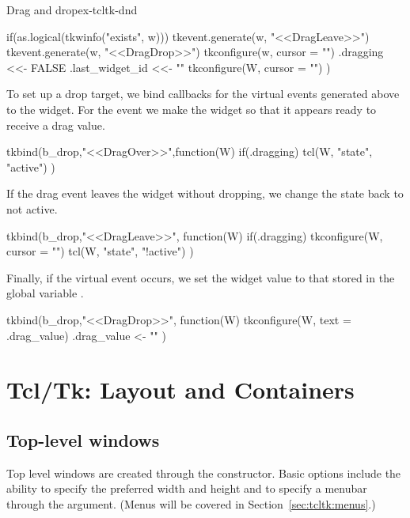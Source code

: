 \begin{example}{Drag and drop}{ex-tcltk-dnd}
\begin{Schunk}
\begin{Sinput}
{   if(as.logical(tkwinfo("exists", w))) {
     tkevent.generate(w, "<<DragLeave>>")
     tkevent.generate(w, "<<DragDrop>>")
     tkconfigure(w, cursor = "")
   }
   .dragging <<- FALSE
   .last_widget_id <<- "" 
   tkconfigure(W, cursor = "")
 })
\end{Sinput}
\end{Schunk}
%
%
To set up a drop target, we bind callbacks for the virtual events
generated above to the widget. For the  event
we make the widget  so that it appears ready to receive a
drag value.
\begin{Schunk}
\begin{Sinput}
 tkbind(b_drop,"<<DragOver>>",function(W) {
   if(.dragging) 
     tcl(W, "state", "active")
 })
\end{Sinput}
\end{Schunk}
%
If the drag event leaves the widget without dropping, we change the
state back to not active.
\begin{Schunk}
\begin{Sinput}
 tkbind(b_drop,"<<DragLeave>>", function(W) {
   if(.dragging)  {
     tkconfigure(W, cursor = "")
     tcl(W, "state", "!active")  
    }
 })
\end{Sinput}
\end{Schunk}
%
Finally, if the  virtual event occurs, we set
the widget value to that stored in the global variable
.
\begin{Schunk}
\begin{Sinput}
 tkbind(b_drop,"<<DragDrop>>", function(W) {
   tkconfigure(W, text = .drag_value)
   .drag_value <- ""
 })
\end{Sinput}
\end{Schunk}
\end{example}



\chapter{Tcl/Tk: Layout and Containers}
\label{sec:tcltk:basic-containers}


\section{Top-level windows}
\label{sec:tcltk:top-level-windows}

Top level windows are created through the 
constructor. Basic options include the ability to specify the
preferred width and height and to specify a menubar through
the  argument. (Menus will be covered in
Section~\ref{sec:tcltk:menus}.)


